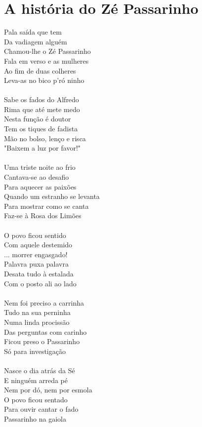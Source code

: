 \documentclass{article}
\begin{document}
\section{ A história do Zé Passarinho}
Pala saída que tem\\
Da vadiagem alguém\\
Chamou-lhe o Zé Passarinho\\
Fala em verso e as mulheres\\
Ao fim de duas colheres\\
Leva-as no bico p'ró ninho\\
\\
Sabe os fados do Alfredo\\
Rima que até mete medo\\
Nesta função é doutor\\
Tem os tiques de fadista\\
Mão no bolso, lenço e risca\\
"Baixem a luz por favor!"\\
\\
Uma triste noite ao frio\\
Cantava-se ao desafio\\
Para aquecer as paixões\\
Quando um estranho se levanta\\
Para mostrar como se canta\\
Faz-se à Rosa dos Limões\\
\\
O povo ficou sentido\\
Com aquele destemido\\
... morrer engasgado!\\
Palavra puxa palavra\\
Desata tudo à estalada\\
Com o posto ali ao lado\\
\\
Nem foi preciso a carrinha\\
Tudo na sua perninha\\
Numa linda procissão\\
Das perguntas com carinho\\
Ficou preso o Passarinho\\
Só para investigação\\
\\
Nasce o dia atrás da Sé\\
E ninguém arreda pé\\
Nem por dó, nem por esmola\\
O povo ficou sentado\\
Para ouvir cantar o fado\\
Passarinho na gaiola\\
\\
\end{document}
